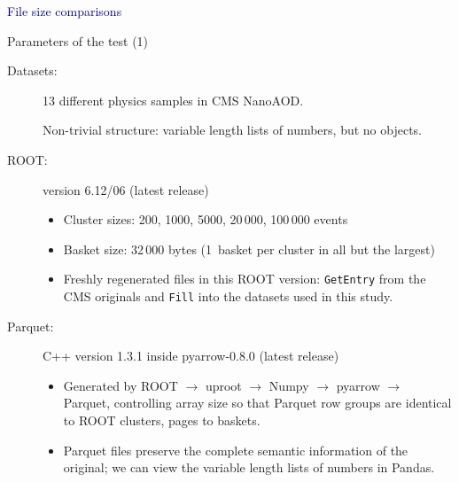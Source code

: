 \documentclass[aspectratio=169]{beamer}
\begin{document}
\begin{frame}{}
\vspace{0.5 cm}
\begin{center}
\Huge \textcolor{darkblue}{File size comparisons}
\end{center}
\end{frame}

\begin{frame}{Parameters of the test (1)}
\vspace{0.35 cm}
\begin{description}
\item[Datasets:] 13 different physics samples in CMS NanoAOD.

\vspace{0.1 cm}
Non-trivial structure: variable length lists of numbers, but no objects.

\vspace{0.2 cm}
\item[ROOT:] version 6.12/06 (latest release)

\begin{itemize}
\item Cluster sizes: 200, 1000, 5000, 20\,000, 100\,000 events
\item Basket size: 32\,000 bytes (1~basket per cluster in all but the largest)
\item Freshly regenerated files in this ROOT version: {\tt\small GetEntry} from the CMS originals and {\tt\small Fill} into the datasets used in this study.
\end{itemize}

\item[Parquet:] C++ version 1.3.1 inside pyarrow-0.8.0 (latest release)

\begin{itemize}
\item Generated by ROOT $\to$ uproot $\to$ Numpy $\to$ pyarrow $\to$ Parquet, controlling array size so that Parquet row groups are identical to ROOT clusters, pages to baskets.
\item Parquet files preserve the complete semantic information of the original; we can view the variable length lists of numbers in Pandas.
\end{itemize}
\end{description}
\end{frame}
\end{document}
